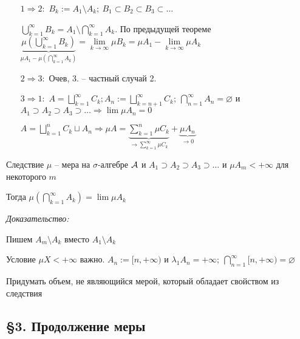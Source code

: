 \documentclass[12pt]{article}
\begin{document}
\begin{itemize}
    \item[$1 \Rightarrow 2 :$] $B_k := A_1 \setminus A_k;\ B_1 \subset B_2 \subset B_3 \subset \ldots$
    
    $\bigcup\limits_{k = 1}^\infty B_k = A_1 \setminus \bigcap\limits_{k = 1}^\infty A_k$. По предыдущей теореме $\underbrace{\mu(\bigcup\limits_{k = 1}^\infty B_k)}_{\mu A_1 - \mu(\bigcap\limits_{k = 1}^\infty A_k)} = \lim\limits_{k \to \infty} \mu B_k = \mu A_1 - \lim\limits_{k \to \infty} \mu A_k$

    \item[$2 \Rightarrow 3 :$] Очев, 3. -- частный случай 2.
    
    \newpage
    
    \item[$3 \Rightarrow 1 :$] $A = \bigsqcup\limits_{k = 1}^\infty C_k; A_n := \bigsqcup\limits_{k = n + 1}^\infty C_k;\ \bigcap\limits_{n = 1}^\infty A_n = \varnothing$ и $A_1 \supset A_2 \supset A_3 \supset \ldots \Rightarrow \lim \mu A_n = 0$
    
    $A = \bigsqcup\limits_{k = 1}^n C_k \sqcup A_n \Rightarrow \mu A = \underbrace{\sum\limits_{k = 1}^n \mu C_k}_{\to \sum\limits_{k = 1}^\infty \mu C_k} + \underbrace{\mu A_n}_{\to 0}$
\end{itemize}

\begin{theo}{Следствие}
    $\mu$ -- мера на $\sigma$-алгебре $\mathcal{A}$ и $A_1 \supset A_2 \supset A_3 \supset \ldots$ и $\mu A_m < + \infty$ для некоторого $m$

    Тогда $\mu(\bigcap\limits_{k = 1}^\infty A_k) = \lim \mu A_k$
\end{theo}

\textit{Доказательство:}

Пишем $A_m \setminus A_k$ вместо $A_1 \setminus A_k$

\begin{Remark}{}
    Условие $\mu X < + \infty$ важно. $A_n := [n, + \infty)$ и $\lambda_1 A_n = + \infty;\ \bigcap\limits_{n = 1}^\infty[n, + \infty) = \varnothing$
\end{Remark}

\begin{Exercise}{}
    Придумать объем, не являющийся мерой, который обладает свойством из следствия
\end{Exercise}

\newpage

\subsection{\S 3. Продолжение меры}
\end{document}
